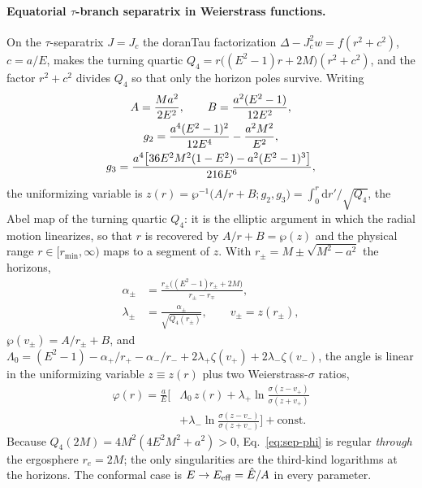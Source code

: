 \documentclass[12pt]{iopart}
\newcommand{\Ehat}{\hat E}
\newcommand{\re}{r_{e}}
\newcommand{\Jc}{J_{c}}
\newcommand{\dd}{\mathrm{d}}
\begin{document}
\paragraph{Equatorial $\tau$-branch separatrix in Weierstrass functions.} On the
$\tau$-separatrix $J=\Jc$ the doranTau factorization $\Delta-\Jc^2 w=f(r^2+c^2)$,
$c=a/E$, makes the
turning quartic $Q_4=r\big((E^2-1)r+2M\big)(r^2+c^2)$, and the factor $r^2+c^2$
divides $Q_4$ so that only the horizon poles survive. Writing
\begin{gather}
    A=\frac{Ma^2}{2E^2},\qquad B=\frac{a^2(E^2-1)}{12E^2},\notag\\
    g_2=\frac{a^4(E^2-1)^2}{12E^4}-\frac{a^2M^2}{E^2},\notag\\
    g_3=\frac{a^4\big[36E^2M^2(1-E^2)-a^2(E^2-1)^3\big]}{216E^6},
    \label{eq:wp-invariants}
\end{gather}
the uniformizing variable is $z(r)=\wp^{-1}\!\big(A/r+B;g_2,g_3\big)
=\int_0^r\dd r'/\sqrt{Q_4}$, the Abel map of the turning quartic $Q_4$: it is the
elliptic argument in which the radial motion linearizes, so that $r$ is recovered
by $A/r+B=\wp(z)$ and the physical range $r\in[r_{\min},\infty)$ maps to a
segment of $z$. With $r_\pm=M\pm\sqrt{M^2-a^2}$ the horizons,
\begin{equation}
\begin{aligned}
    \alpha_\pm&=\frac{r_\pm\big((E^2-1)r_\pm+2M\big)}{r_\pm-r_\mp},\\
    \lambda_\pm&=\frac{\alpha_\pm}{\sqrt{Q_4(r_\pm)}},\qquad v_\pm=z(r_\pm),
\end{aligned}
\end{equation}
$\wp(v_\pm)=A/r_\pm+B$, and
$\Lambda_0=(E^2-1)-\alpha_+/r_+-\alpha_-/r_-+2\lambda_+\zeta(v_+)+2\lambda_-\zeta(v_-)$,
the angle is linear in the uniformizing variable $z\equiv z(r)$ plus two
Weierstrass-$\sigma$ ratios,
\begin{equation}
\begin{split}
    \varphi(r)=\frac{a}{E}\Big[&\Lambda_0\,z(r)
      +\lambda_+\ln\frac{\sigma(z-v_+)}{\sigma(z+v_+)}\\
      &+\lambda_-\ln\frac{\sigma(z-v_-)}{\sigma(z+v_-)}\Big]+\text{const}.
\end{split}
    \label{eq:sep-phi}
\end{equation}
Because $Q_4(2M)=4M^2(4E^2M^2+a^2)>0$, Eq.~\eqref{eq:sep-phi} is regular
\emph{through} the ergosphere $\re=2M$; the only singularities are the
third-kind logarithms at the horizons. The conformal case is
$E\to E_{\rm eff}=\Ehat/A$ in every parameter.
\end{document}
